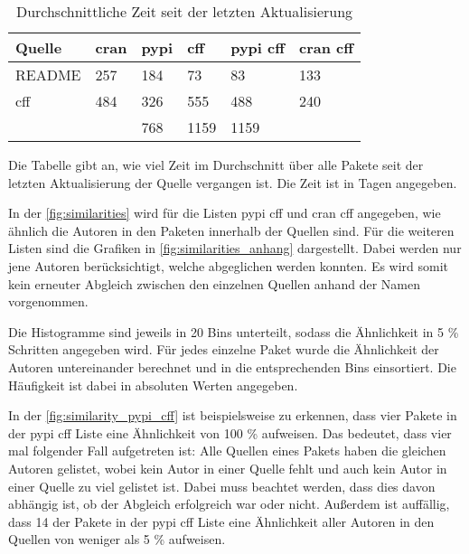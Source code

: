\begin{table}
    \centering
    \begin{tabularx}{\textwidth}{XR{1.3cm}R{1.3cm}R{1.3cm}R{2.4cm}R{2.6cm}}
        \toprule
        \textbf{Quelle} & \textbf{\gls{cran}} & \textbf{\gls{pypi}} & \textbf{\gls{cff}} & \textbf{\gls{pypi} \gls{cff}} & \textbf{\gls{cran} \gls{cff}} \\ 
        \midrule
        README          & 257 & 184 & 73   & 83   & 133 \\
        \gls{cff}       & 484 & 326 & 555  & 488  & 240 \\
         &     & 768 & 1159 & 1159 &     \\
        \bottomrule
    \end{tabularx}
    \caption{Durchschnittliche Zeit seit der letzten Aktualisierung}
    \label{tab:average_time_last_update}
    \small
    \raggedright
    Die Tabelle gibt an, wie viel Zeit im Durchschnitt über alle Pakete seit der letzten Aktualisierung der Quelle vergangen ist. Die Zeit ist in Tagen angegeben.
\end{table}

In der \autoref{fig:similarities} wird für die Listen \gls{pypi} \gls{cff} und \gls{cran} \gls{cff} angegeben, wie ähnlich die Autoren in den Paketen innerhalb der Quellen sind.
Für die weiteren Listen sind die Grafiken in \autoref{fig:similarities_anhang} dargestellt.
Dabei werden nur jene Autoren berücksichtigt, welche abgeglichen werden konnten.
Es wird somit kein erneuter Abgleich zwischen den einzelnen Quellen anhand der Namen vorgenommen.

Die Histogramme sind jeweils in 20 Bins unterteilt, sodass die Ähnlichkeit in 5 \% Schritten angegeben wird.
Für jedes einzelne Paket wurde die Ähnlichkeit der Autoren untereinander berechnet und in die entsprechenden Bins einsortiert.
Die Häufigkeit ist dabei in absoluten Werten angegeben.

In der \autoref{fig:similarity_pypi_cff} ist beispielsweise zu erkennen, dass vier Pakete in der \gls{pypi} \gls{cff} Liste eine Ähnlichkeit von 100 \% aufweisen.
Das bedeutet, dass vier mal folgender Fall aufgetreten ist: Alle Quellen eines Pakets haben die gleichen Autoren gelistet, wobei kein Autor in einer Quelle fehlt und auch kein Autor in einer Quelle zu viel gelistet ist.
Dabei muss beachtet werden, dass dies davon abhängig ist, ob der Abgleich erfolgreich war oder nicht.
Außerdem ist auffällig, dass 14 der Pakete in der \gls{pypi} \gls{cff} Liste eine Ähnlichkeit aller Autoren in den Quellen von weniger als 5 \% aufweisen.

